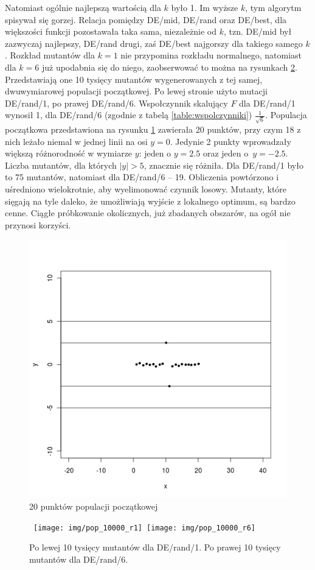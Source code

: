 \documentclass[a4paper,onecolumn,oneside,11pt,wide,floatssmall]{mwrep}
\theoremstyle{definition}
\theoremstyle{plain}%
\theoremstyle{remark}
\begin{document}
Natomiast ogólnie najlepszą wartością dla $k$ było 1. Im wyższe $k$, tym algorytm spisywał się gorzej.
Relacja pomiędzy DE/mid, DE/rand oraz DE/best, dla większości funkcji pozostawała taka sama, 
niezależnie od $k$, tzn. DE/mid był zazwyczaj najlepszy, DE/rand drugi, zaś DE/best najgorszy
dla takiego samego $k$. Rozkład mutantów dla $k = 1$ nie przypomina rozkładu normalnego, 
natomiast dla $k = 6$ już upodabnia się do niego, zaobserwować to można na rysunkach \ref{fig:10k}. 
Przedstawiają one 10 tysięcy mutantów wygenerowanych z tej samej, dwuwymiarowej populacji początkowej.
Po lewej stronie użyto mutacji DE/rand/1, po prawej DE/rand/6. Wspołczynnik skalujący $F$ dla 
DE/rand/1 wynosił 1, dla DE/rand/6 (zgodnie z tabelą \ref{table:wspolczynniki}) $\frac{1}{\sqrt{6}}$.
Populacja początkowa przedstawiona na rysunku \ref{fig:10k_start} zawierała 20 punktów, 
przy czym 18 z nich leżało niemal w jednej linii na osi $y = 0$. 
Jedynie 2 punkty wprowadzały większą różnorodność 
w wymiarze $y$: jeden o $y = 2.5$ oraz jeden o~$y = -2.5$. Liczba mutantów,
dla których $|y| > 5$, znacznie się różniła. Dla DE/rand/1 było to 75 mutantów,
natomiast dla DE/rand/6 -- 19. Obliczenia
powtórzono i uśredniono wielokrotnie, aby wyelimonować czynnik losowy. Mutanty, które sięgają
na tyle daleko, że umożliwiają wyjście z lokalnego optimum, są bardzo cenne. 
Ciągłe próbkowanie okolicznych, już zbadanych obszarów, na ogół nie przynosi korzyści. 

\begin{figure}[H]
\centering
\includegraphics[width=.5\textwidth]{img/pop} 
\caption{20 punktów populacji początkowej} 
\label{fig:10k_start}
\end{figure}

\begin{figure}[H]
\centering
\mbox{
\texttt{[image: img/pop\_10000\_r1]}
\texttt{[image: img/pop\_10000\_r6]}  
}
\caption{Po lewej 10 tysięcy mutantów dla DE/rand/1. Po prawej 10 tysięcy mutantów dla DE/rand/6.} 
\label{fig:10k}
\end{figure}
\end{document}
